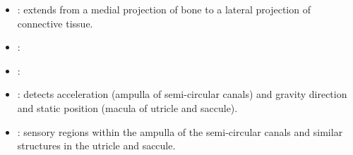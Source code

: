 \begin{multicols}{2}
\begin{itemize}
  \begin{center}
  \end{center}
  
  \item {}: extends from a medial projection of bone to a lateral projection of connective tissue.
  
  \begin{center}
  \end{center}
  
  \item {}:
  
  \begin{center}
  \end{center}
  
  \item {}:
  
  \begin{center}
  \end{center}
  
  \item {}:  detects acceleration (ampulla of semi-circular canals) and gravity direction and static position (macula of utricle and saccule).
  
  \begin{center}
  \end{center}
  
  \item {}:  sensory regions within the ampulla of the semi-circular canals and similar structures in the utricle and saccule. 
  
  \begin{center}
  \end{center}
  
\end{itemize}
\end{multicols}

